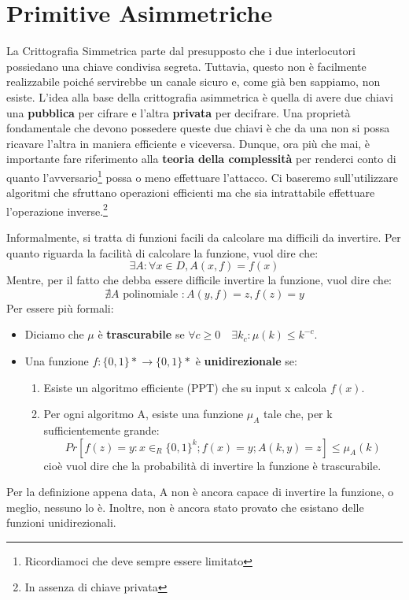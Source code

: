 \chapter{Primitive Asimmetriche}
La Crittografia Simmetrica parte dal presupposto che i due interlocutori possiedano una chiave condivisa segreta. Tuttavia, questo non è facilmente realizzabile poiché servirebbe un canale sicuro e, come già ben sappiamo, non esiste. L'idea alla base della crittografia asimmetrica è quella di avere due chiavi una \textbf{pubblica} per cifrare e l'altra \textbf{privata} per decifrare. Una proprietà fondamentale che devono possedere queste due chiavi è che da una non si possa ricavare l'altra in maniera efficiente e viceversa. Dunque, ora più che mai, è importante fare riferimento alla \textbf{teoria della complessità} per renderci conto di quanto l'avversario\footnote{Ricordiamoci che deve sempre essere limitato} possa o meno effettuare l'attacco.
Ci baseremo sull'utilizzare algoritmi che sfruttano operazioni efficienti ma che sia intrattabile effettuare l'operazione inverse.\footnote{In assenza di chiave privata}

Informalmente, si tratta di funzioni facili da calcolare ma difficili da invertire. Per quanto riguarda la facilità di calcolare la funzione, vuol dire che:
\[\exists A : \forall x \in D, A(x,f)=f(x)\]
Mentre, per il fatto che debba essere difficile invertire la funzione, vuol dire che:
\[\nexists A\text{ polinomiale }: A(y,f)=z, f(z)=y\]
Per essere più formali:
\begin{itemize}
    \item Diciamo che $\mu$ è \textbf{trascurabile} se $\forall c \geq 0 \quad \exists k_c : \mu(k) \leq k^{-c}$.
    \item Una funzione $f:\{0,1\}*\xrightarrow{}\{0,1\}*$ è \textbf{unidirezionale} se:
        \begin{enumerate}
            \item Esiste un algoritmo efficiente (PPT) che su input x calcola $f(x)$.
            \item Per ogni algoritmo A, esiste una funzione $\mu_A$ tale che, per k sufficientemente grande:
            \[Pr[f(z)=y : x\in_R\{0,1\}^k;f(x)=y; A(k,y)=z]\leq \mu_A(k)\]
            cioè vuol dire che la probabilità di invertire la funzione è trascurabile.
        \end{enumerate}
\end{itemize}
Per la definizione appena data, A non è ancora capace di invertire la funzione, o meglio, nessuno lo è. Inoltre, non è ancora stato provato che esistano delle funzioni unidirezionali.

